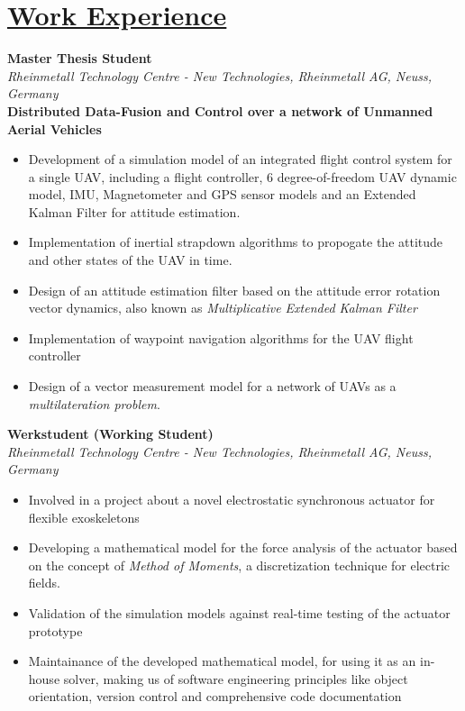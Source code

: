 
\section{\underline{Work Experience}}

\large{\textbf{Master Thesis Student}}
\hfill
\masterarbeitdate\\
\large{\emph{Rheinmetall Technology Centre - New Technologies, Rheinmetall AG, Neuss, Germany}}\\
\large{\textbf{Distributed Data-Fusion and Control over a network of Unmanned Aerial Vehicles}}\\
\masterarbeitBetreuer
\begin{itemize}
    \item Development of a simulation model of an integrated flight control system for a single UAV, including a flight controller, 6 degree-of-freedom UAV dynamic model, IMU, Magnetometer and GPS sensor models and an Extended Kalman Filter for attitude estimation.
    \item Implementation of inertial strapdown algorithms to propogate the attitude and other states of the UAV in time.
    \item Design of an attitude estimation filter based on the attitude error rotation vector dynamics, also known as \emph{Multiplicative Extended Kalman Filter}
    \item Implementation of waypoint navigation algorithms for the UAV flight controller
    \item Design of a vector measurement model for a network of UAVs as a \emph{multilateration problem}.
\end{itemize}

\large{\textbf{Werkstudent (Working Student)}}
\hfill
\rheinmetalldate\\
\large{\emph{Rheinmetall Technology Centre - New Technologies, Rheinmetall AG, Neuss, Germany}}
\begin{itemize}
\item\large{Involved in a project about a novel electrostatic synchronous actuator for flexible exoskeletons}
\item\large{Developing a mathematical model for the force analysis of the actuator based on the concept of \emph{Method of Moments}, a discretization technique for electric fields.}
\item\large{Validation of the simulation models against real-time testing of the actuator prototype}
\item\large{Maintainance of the developed mathematical model, for using it as an in-house solver, making us of software engineering principles like object orientation, version control and comprehensive code documentation}
\end{itemize}

